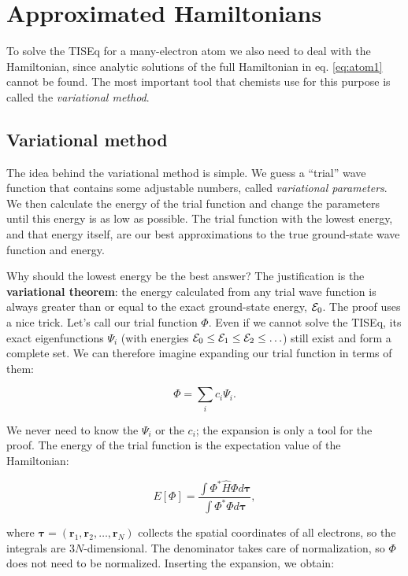 \documentclass[
  english,
  9pt,
]{extbook}
\theoremstyle{definition}
\theoremstyle{definition}
\theoremstyle{definition}
\theoremstyle{definition}
\theoremstyle{remark}
\begin{document}
\section{Approximated Hamiltonians}\label{approximated-hamiltonians}

To solve the TISEq for a many-electron atom we also need to deal with the Hamiltonian, since analytic solutions of the full Hamiltonian in eq. \eqref{eq:atom1} cannot be found. The most important tool that chemists use for this purpose is called the \emph{variational method}.

\subsection{Variational method}\label{variational-method}

The idea behind the variational method is simple. We guess a ``trial'' wave function that contains some adjustable numbers, called \emph{variational parameters}. We then calculate the energy of the trial function and change the parameters until this energy is as low as possible. The trial function with the lowest energy, and that energy itself, are our best approximations to the true ground-state wave function and energy.

Why should the lowest energy be the best answer? The justification is the \textbf{variational theorem}: the energy calculated from any trial wave function is always greater than or equal to the exact ground-state energy, \({\cal E}_0\). The proof uses a nice trick. Let's call our trial function \(\Phi\). Even if we cannot solve the TISEq, its exact eigenfunctions \(\Psi_i\) (with energies \({\cal E}_0 \leq {\cal E}_1 \leq {\cal E}_2 \leq \ldots\)) still exist and form a complete set. We can therefore imagine expanding our trial function in terms of them:

\begin{equation}
\Phi = \sum_i c_i \Psi_i.
\label{eq:var1}
\end{equation}

We never need to know the \(\Psi_i\) or the \(c_i\); the expansion is only a tool for the proof. The energy of the trial function is the expectation value of the Hamiltonian:

\begin{equation}
E[\Phi] = \frac{\int \Phi^* {\hat H} \Phi d\mathbf{\tau}}{\int \Phi^* \Phi d\mathbf{\tau}},
\label{eq:var2}
\end{equation}

where \(\mathbf{\tau}=\left(\mathbf{r}_1,\mathbf{r}_2,\ldots,\mathbf{r}_N\right)\) collects the spatial coordinates of all electrons, so the integrals are \(3N\)-dimensional. The denominator takes care of normalization, so \(\Phi\) does not need to be normalized. Inserting the expansion, we obtain:
\end{document}
